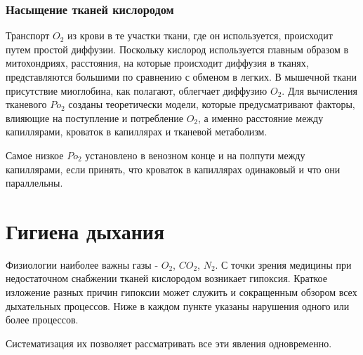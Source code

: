 \documentclass[a4paper,14pt]{extreport}
\begin{document}
\subsection{Насыщение  тканей  кислородом}

Транспорт  $O_2$  из  крови  в  те  участки  ткани,  где  он  используется,  происходит  путем  простой  диффузии. 
Поскольку  кислород  используется  главным  образом  в  митохондриях,  расстояния,  на  которые  происходит  диффузия в тканях,  представляются  большими  по  сравнению  с  обменом  в  легких.  В  мышечной  ткани  присутствие  миоглобина,  как  полагают,  облегчает  диффузию  $O_2$.  Для  вычисления  тканевого  $Po_2$  созданы  теоретически  модели,  которые  предусматривают  факторы,  влияющие на поступление  и  потребление  $O_2$,  а  именно  расстояние  между  капиллярами,  кроваток  в  капиллярах  и  тканевой  метаболизм.  

Самое  низкое $Po_2$  установлено  в  венозном  конце  и  на  полпути  между  капиллярами,  если  принять, что кроваток  в  капиллярах  одинаковый  и  что  они  параллельны.

\chapter{Гигиена дыхания}

Физиологии  наиболее  важны газы - $O_2$, $CO_2$, $N_2$.   С  точки  зрения медицины  при недостаточном  снабжении  тканей кислородом  возникает  гипоксия.  Краткое изложение разных причин гипоксии может служить и сокращенным обзором всех дыхательных процессов. Ниже в каждом пункте указаны нарушения одного или более процессов.

Систематизация их позволяет рассматривать все эти явления одновременно.
\end{document}
